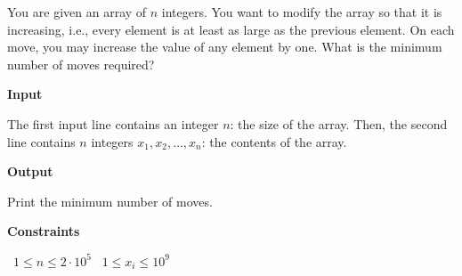 You are given an array of $n$ integers. You want to modify the array so that it is increasing, i.e., every element is at least as large as the previous element.
On each move, you may increase the value of any element by one. What is the minimum number of moves required?

\vspace{0.3cm}\noindent\textbf{Input}

The first input line contains an integer $n$: the size of the array.
Then, the second line contains $n$ integers $x_1,x_2,\ldots,x_n$: the contents of the array.

\vspace{0.3cm}\noindent\textbf{Output}

Print the minimum number of moves.

\vspace{0.3cm}\noindent\textbf{Constraints}

\textbullet\ $1 \le n \le 2 \cdot 10^5$
\textbullet\ $1 \le x_i \le 10^9$